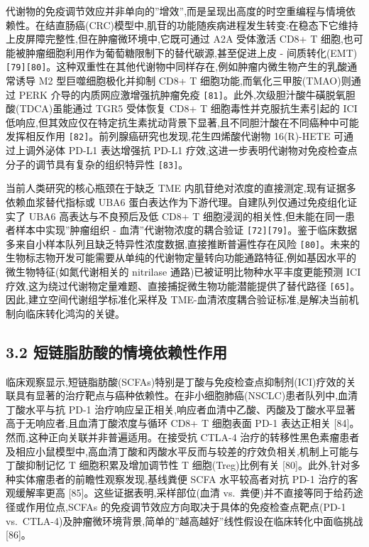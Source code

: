 代谢物的免疫调节效应并非单向的''增效'',而是呈现出高度的时空重编程与情境依赖性。在结直肠癌(CRC)模型中,肌苷的功能随疾病进程发生转变:在稳态下它维持上皮屏障完整性,但在肿瘤微环境中,它既可通过 A2A 受体激活 CD8+ T 细胞,也可能被肿瘤细胞利用作为葡萄糖限制下的替代碳源,甚至促进上皮 - 间质转化(EMT) \texttt{{[}79{]}{[}80{]}}。这种双重性在其他代谢物中同样存在,例如肿瘤内微生物产生的乳酸通常诱导 M2 型巨噬细胞极化并抑制 CD8+ T 细胞功能,而氧化三甲胺(TMAO)则通过 PERK 介导的内质网应激增强抗肿瘤免疫 \texttt{{[}81{]}}。此外,次级胆汁酸牛磺脱氧胆酸(TDCA)虽能通过 TGR5 受体恢复 CD8+ T 细胞毒性并克服抗生素引起的 ICI 低响应,但其效应仅在特定抗生素扰动背景下显著,且不同胆汁酸在不同癌种中可能发挥相反作用 \texttt{{[}82{]}}。前列腺癌研究也发现,花生四烯酸代谢物 16(R)-HETE 可通过上调外泌体 PD-L1 表达增强抗 PD-L1 疗效,这进一步表明代谢物对免疫检查点分子的调节具有复杂的组织特异性 \texttt{{[}83{]}}。

当前人类研究的核心瓶颈在于缺乏 TME 内肌苷绝对浓度的直接测定,现有证据多依赖血浆替代指标或 UBA6 蛋白表达作为下游代理。自建队列仅通过免疫组化证实了 UBA6 高表达与不良预后及低 CD8+ T 细胞浸润的相关性,但未能在同一患者样本中实现''肿瘤组织 - 血清''代谢物浓度的耦合验证 \texttt{{[}72{]}{[}79{]}}。鉴于临床数据多来自小样本队列且缺乏特异性浓度数据,直接推断普遍性存在风险 \texttt{{[}80{]}}。未来的生物标志物开发可能需要从单纯的代谢物定量转向功能通路特征,例如基因水平的微生物特征(如氮代谢相关的 nitrilase 通路)已被证明比物种水平丰度更能预测 ICI 疗效,这为绕过代谢物定量难题、直接捕捉微生物功能潜能提供了替代路径 \texttt{{[}65{]}}。因此,建立空间代谢组学标准化采样及 TME-血清浓度耦合验证标准,是解决当前机制向临床转化鸿沟的关键。

\subsection{3.2 短链脂肪酸的情境依赖性作用}\label{ux77edux94feux8102ux80aaux9178ux7684ux60c5ux5883ux4f9dux8d56ux6027ux4f5cux7528}

临床观察显示,短链脂肪酸(SCFAs)特别是丁酸与免疫检查点抑制剂(ICI)疗效的关联具有显著的治疗靶点与癌种依赖性。在非小细胞肺癌(NSCLC)患者队列中,血清丁酸水平与抗 PD-1 治疗响应呈正相关,响应者血清中乙酸、丙酸及丁酸水平显著高于无响应者,且血清丁酸浓度与循环 CD8+ T 细胞表面 PD-1 表达正相关 {[}84{]}。然而,这种正向关联并非普遍适用。在接受抗 CTLA-4 治疗的转移性黑色素瘤患者及相应小鼠模型中,高血清丁酸和丙酸水平反而与较差的疗效负相关,机制上可能与丁酸抑制记忆 T 细胞积累及增加调节性 T 细胞(Treg)比例有关 {[}80{]}。此外,针对多种实体瘤患者的前瞻性观察发现,基线粪便 SCFA 水平较高者对抗 PD-1 治疗的客观缓解率更高 {[}85{]}。这些证据表明,采样部位(血清 vs.~粪便)并不直接等同于给药途径或作用位点,SCFAs 的免疫调节效应方向取决于具体的免疫检查点靶点(PD-1 vs.~CTLA-4)及肿瘤微环境背景,简单的''越高越好''线性假设在临床转化中面临挑战 {[}86{]}。

